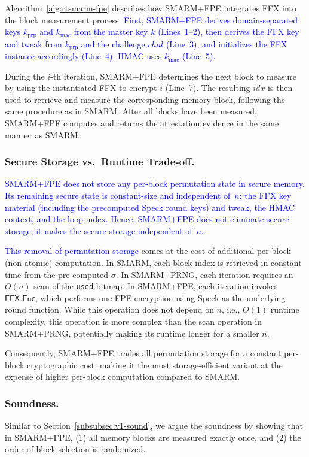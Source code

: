 \documentclass[journal]{IEEEtran}
\newcommand\ben[1]{\textcolor{blue}{#1}}
\newcommand{\rtsmarmone}{SMARM+PRNG\xspace}
\newcommand{\rtsmarmtwo}{SMARM+FPE\xspace}
\begin{document}
Algorithm~\ref{alg:rtsmarm-fpe} describes how \rtsmarmtwo integrates FFX into the block measurement process.
\ben{First, \rtsmarmtwo derives domain-separated keys $k_{\mathrm{prp}}$ and $k_{\mathrm{mac}}$ from the master key $k$ (Lines~1--2), then derives the FFX key and tweak from $k_{\mathrm{prp}}$ and the challenge $chal$ (Line~3), and initializes the FFX instance accordingly (Line~4). HMAC uses $k_{\mathrm{mac}}$ (Line~5).}


During the $i$-th iteration, \rtsmarmtwo determines the next block to measure by using the instantiated FFX to encrypt $i$ (Line~7).
The resulting $idx$ is then used to retrieve and measure the corresponding memory block, following the same procedure as in SMARM.
After all blocks have been measured, \rtsmarmtwo computes and returns the attestation evidence in the same manner as SMARM.

\subsubsection{Secure Storage vs.\ Runtime Trade-off.}
\ben{\rtsmarmtwo does not store any per-block permutation state in secure memory.
Its remaining secure state is constant-size and independent of~$n$: the FFX key material (including the precomputed Speck round keys) and tweak, the HMAC context, and the loop index.
Hence, \rtsmarmtwo does not eliminate secure storage; it makes the secure storage independent of~$n$.}


\ben{This removal of permutation storage} comes at the cost 
of additional per-block (non-atomic) computation.
In SMARM, each block index is retrieved in constant time 
from the pre-computed $\sigma$.
In \rtsmarmone, each iteration requires an $O(n)$ scan of 
the \texttt{used} bitmap.
In \rtsmarmtwo, each iteration invokes 
$\mathsf{FFX.Enc}$, which performs one FPE encryption using Speck as the underlying round function. 
While this operation does not depend on $n$, i.e., $O(1)$ runtime complexity, this operation is more complex than the scan operation in \rtsmarmone, potentially making its runtime longer for a smaller $n$.

Consequently, \rtsmarmtwo trades all permutation storage 
for a constant per-block cryptographic cost, making it 
the most storage-efficient variant at the expense of higher per-block computation compared to SMARM.

\subsubsection{Soundness.}
Similar to Section~\ref{subsubsec:v1-sound}, we argue the soundness by showing that in \rtsmarmtwo, (1) all memory blocks are measured exactly once, and (2) the order of block selection is randomized.
\end{document}

